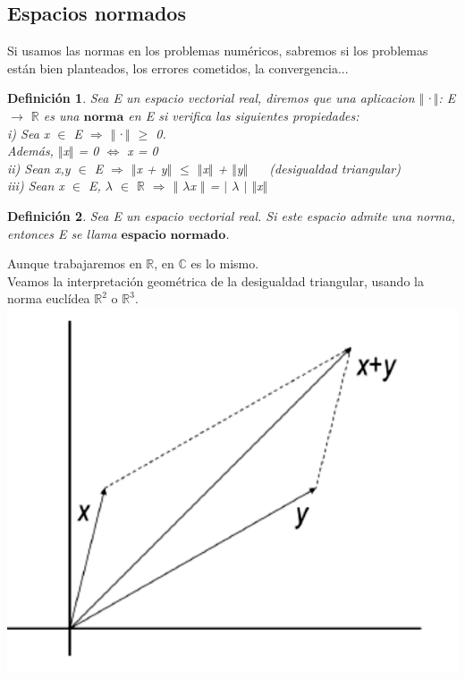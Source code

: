 \documentclass[10pt, a4paper]{article}
\theoremstyle{theorem-style}
\theoremstyle{definition-style}
\newtheorem{ndef}{Definición}[section]
\theoremstyle{remark-style}
\theoremstyle{example-style}
\theoremstyle{definition-style}
\theoremstyle{remark-style}
\begin{document}
\subsection{Espacios normados}
Si usamos las normas en los problemas numéricos, sabremos si los problemas están bien planteados, los errores cometidos, la convergencia...\\

\begin{ndef}
Sea E un espacio vectorial real, diremos que una aplicacion $\Vert$·$\Vert$: E $\rightarrow$ $\mathbb{R}$ es una $\textbf{norma}$ en E si verifica las siguientes propiedades:\\
i) Sea x $\in$ E $\Rightarrow$ $\Vert$·$\Vert$ $\geq$ 0.\\ 
Además, $\Vert$x$\Vert$ = 0 $\Leftrightarrow$ x = 0\\
ii) Sean x,y $\in$ E $\Rightarrow$ $\Vert$x + y$\Vert$ $\leq$ $\Vert$x$\Vert$ + $\Vert$y$\Vert$ $\quad$ (desigualdad triangular)\\
iii) Sean x $\in$ E, $\lambda$ $\in$ $\mathbb{R}$ $\Rightarrow$ $\Vert$ $\lambda$x $\Vert$ = $\vert$ $\lambda$ $\vert$ $\Vert$x$\Vert$\\
\end{ndef}

\begin{ndef}
Sea E un espacio vectorial real. Si este espacio admite una norma, entonces E se llama $\textbf{espacio normado}$.
\end{ndef}

Aunque trabajaremos en $\mathbb{R}$, en $\mathbb{C}$ es lo mismo.\\

Veamos la interpretación geométrica de la desigualdad triangular, usando la norma euclídea $\mathbb{R}^2$ o $\mathbb{R}^3$.\\
\includegraphics[scale=0.2]{media/desigualdadtriangular.png}
\end{document}
